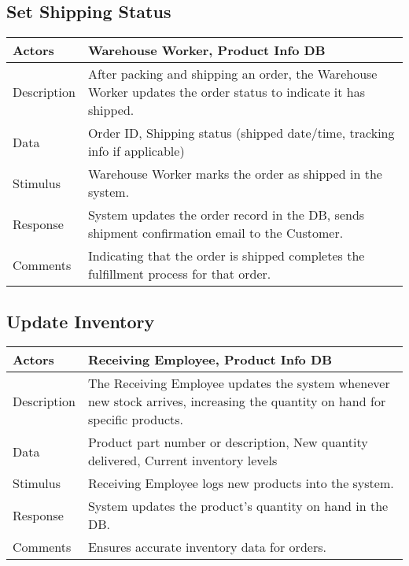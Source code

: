 \documentclass{report}
\begin{document}
    \pagebreak 
    \subsection{Set Shipping Status}
    \bigbreak \noindent 
    \begin{center}
        \begin{tabular}{|p{4cm}|p{8cm}|}
            \hline
            Actors & 
            Warehouse Worker, Product Info DB \\
            \hline
            Description & 
            After packing and shipping an order, the Warehouse Worker 
            updates the order status to indicate it has shipped. \\
            \hline
            Data & 
            Order ID, Shipping status (shipped date/time, tracking info if applicable) \\
            \hline
            Stimulus & 
            Warehouse Worker marks the order as shipped in the system. \\
            \hline
            Response & 
            System updates the order record in the DB, sends 
            shipment confirmation email to the Customer. \\
            \hline
            Comments & 
            Indicating that the order is shipped completes the fulfillment 
            process for that order. \\
            \hline
        \end{tabular}
    \end{center}

    \pagebreak 
    \subsection{Update Inventory}
    \bigbreak \noindent 
    \begin{center}
    \begin{tabular}{|p{4cm}|p{8cm}|}
        \hline
        Actors & 
        Receiving Employee, Product Info DB\\
        \hline
        Description & 
        The Receiving Employee updates the system whenever new stock 
        arrives, increasing the quantity on hand for specific products. \\
        \hline
        Data & 
        Product part number or description, New quantity delivered, Current inventory levels \\
        \hline
        Stimulus & 
        Receiving Employee logs new products into the system. \\
        \hline
        Response & 
        System updates the product’s quantity on hand in the DB. \\
        \hline
        Comments & 
        Ensures accurate inventory data for orders.  \\
        \hline
    \end{tabular}
\end{center}
\end{document}
